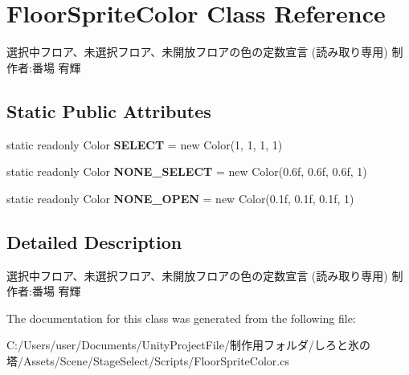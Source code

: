 \hypertarget{class_floor_sprite_color}{}\section{Floor\+Sprite\+Color Class Reference}
\label{class_floor_sprite_color}


選択中フロア、未選択フロア、未開放フロアの色の定数宣言 (読み取り専用) 制作者\+:番場 宥輝  


\subsection*{Static Public Attributes}
\begin{DoxyCompactItemize}
\item 
\mbox{\label{class_floor_sprite_color_a70436a81b26ae83f3e407ae268b9a7e4}} 
static readonly Color {\bfseries S\+E\+L\+E\+CT} = new Color(1, 1, 1, 1)
\item 
\mbox{\label{class_floor_sprite_color_afa60e908fd1ce1c28c7d85195bd73864}} 
static readonly Color {\bfseries N\+O\+N\+E\+\_\+\+S\+E\+L\+E\+CT} = new Color(0.\+6f, 0.\+6f, 0.\+6f, 1)
\item 
\mbox{\label{class_floor_sprite_color_a885cd21c20fa5b5133762d45b0f39336}} 
static readonly Color {\bfseries N\+O\+N\+E\+\_\+\+O\+P\+EN} = new Color(0.\+1f, 0.\+1f, 0.\+1f, 1)
\end{DoxyCompactItemize}


\subsection{Detailed Description}
選択中フロア、未選択フロア、未開放フロアの色の定数宣言 (読み取り専用) 制作者\+:番場 宥輝 



The documentation for this class was generated from the following file\+:\begin{DoxyCompactItemize}
\item 
C\+:/\+Users/user/\+Documents/\+Unity\+Project\+File/制作用フォルダ/しろと氷の塔/\+Assets/\+Scene/\+Stage\+Select/\+Scripts/Floor\+Sprite\+Color.\+cs\end{DoxyCompactItemize}
